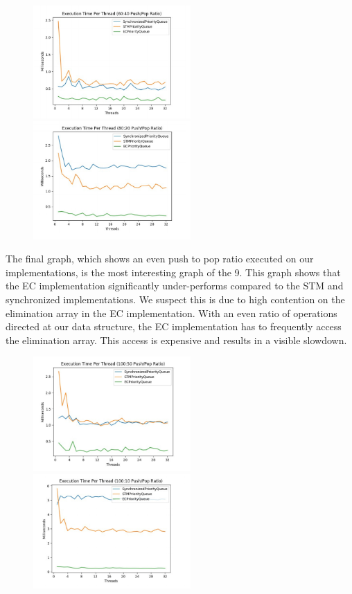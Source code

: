 \documentclass[10pt]{asme2ej}
\begin{document}
\begin{figure}[htp]
\centering
\includegraphics[width=6cm]{5.jpg}
\includegraphics[width=6cm]{6.jpg}
\end{figure}

The final graph, which shows an even push to pop ratio executed on our implementations, is the most
interesting graph of the 9. This graph shows that the EC implementation significantly under-performs
compared to the STM and synchronized implementations. We suspect this is due to high contention on
the elimination array in the EC implementation. With an even ratio of operations directed at our data
structure, the EC implementation has to frequently access the elimination array. This access is
expensive and results in a visible slowdown.

\begin{figure}[htp]
\centering
\includegraphics[width=6cm]{7.jpg}
\includegraphics[width=6cm]{8.jpg}
\end{figure}
\end{document}
